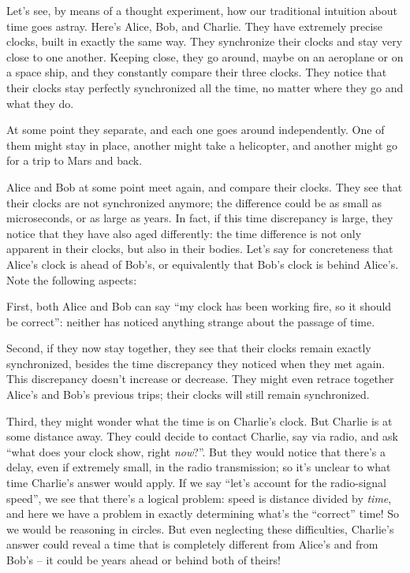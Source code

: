 \documentclass[a4paper,12pt,%
onecolumn,oneside,%
british%
]{memoir}
\renewcommand*{\|}[1][]{\nonscript\:#1\vert\nonscript\:\mathopen{}}
\begin{document}
Let's see, by means of a thought experiment, how our traditional intuition about time goes astray. Here's Alice, Bob, and Charlie. They have extremely precise clocks, built in exactly the same way. They synchronize their clocks and stay very close to one another. Keeping close, they go around, maybe on an aeroplane or on a space ship, and they constantly compare their three clocks. They notice that their clocks stay perfectly synchronized all the time, no matter where they go and what they do.

At some point they separate, and each one goes around independently. One of them might stay in place, another might take a helicopter, and another might go for a trip to Mars and back.

Alice and Bob at some point meet again, and compare their clocks. They see that their clocks are not synchronized anymore; the difference could be as small as microseconds, or as large as years. In fact, if this time discrepancy is large, they notice that they have also aged differently: the time difference is not only apparent in their clocks, but also in their bodies. Let's say for concreteness that Alice's clock is ahead of Bob's, or equivalently that Bob's clock is behind Alice's. Note the following aspects:

First, both Alice and Bob can say \enquote{my clock has been working fire, so it should be correct}: neither has noticed anything strange about the passage of time.

Second, if they now stay together, they see that their clocks remain exactly synchronized, besides the time discrepancy they noticed when they met again. This discrepancy doesn't increase or decrease. They might even retrace together Alice's and Bob's previous trips; their clocks will still remain synchronized.

Third, they might wonder what the time is on Charlie's clock. But Charlie is at some distance away. They could decide to contact Charlie, say via radio, and ask \enquote{what does your clock show, right \emph{now}?}. But they would notice that there's a delay, even if extremely small, in the radio transmission; so it's unclear to what time Charlie's answer would apply. If we say \enquote{let's account for the radio-signal speed}, we see that there's a logical problem: speed is distance divided by \emph{time}, and here we have a problem in exactly determining what's the \enquote{correct} time! So we would be reasoning in circles. But even neglecting these difficulties, Charlie's answer could reveal a time that is completely different from Alice's and from Bob's -- it could be years ahead or behind both of theirs!
\end{document}
